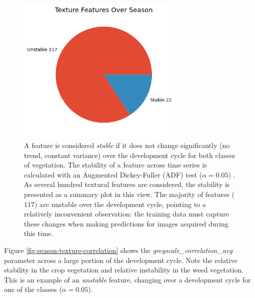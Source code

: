 \documentclass[letterpaper, notitlepage]{report}
\begin{document}
\begin{figure}[h!]
	\centering
	\includegraphics[width=8cm]{./figures/season-texture.png}
	\caption[Stability of factor over growing season]{A feature is considered \textit{stable} if it does not change significantly (no trend, constant variance) over the development cycle for both classes of vegetation. The stability of a feature across time series is calculated with an Augmented Dickey-Fuller (ADF) test ($\alpha=0.05$) \parencite{Dickey1979-ft}. As several hundred textural features are considered, the stability is presented as a summary plot in this view. The majority of features ($117$) are unstable over the development cycle, pointing to a relatively inconvenient observation: the training data must capture these changes when making predictions for images acquired during this time.}
	\label{fig:season-texture}
\end{figure}

Figure \ref{fig:season-texture-correlation} shows the \textit{greyscale\_correlation\_avg} parameter across a large portion of the development cycle. Note the relative stability in the crop vegetation and relative instability in the weed vegetation. This is an example of an \textit{unstable} feature, changing over a development cycle for one of the classes ($\alpha = 0.05$).

\end{document}
